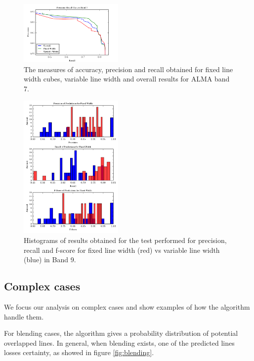 \begin{figure}[H]
	\begin{center}
		\includegraphics[width=0.45\textwidth]{images/results2}
		\caption{ The measures of accuracy, precision and recall obtained for fixed line width cubes, variable line width and overall results for ALMA band 7. }
		\label{fig:results2}
	\end{center}
\end{figure}

\begin{figure}[H]
	\begin{center}
		\includegraphics[width=0.45\textwidth]{images/hist1}
		\caption{ Histograms of results obtained for the test performed for precision, recall and f-score for fixed line width (red) vs variable line width (blue) in Band 9.}
		\label{fig:hist1}
	\end{center}
\end{figure}

\subsection{Complex cases}
We focus our analysis on complex cases and show examples of how the algorithm handle them.

For blending cases, the algorithm gives a probability distribution of potential overlapped lines. In general, when blending exists, one of the predicted lines losses certainty, as showed in figure \ref{fig:blending}.

